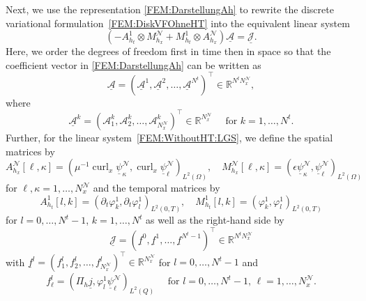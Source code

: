\documentclass[a4paper,11pt]{article}
\newcommand{\R}{\mathbb R}
\newcommand{\cu}{\operatorname{curl}}
\newcommand{\vecA}{\vec{\mathcal A}}
\renewcommand{\vec}[1]{\underline{#1}}
\begin{document}
Next, we use the representation \eqref{FEM:DarstellungAh} to rewrite the discrete variational formulation~\eqref{FEM:DiskVFOhneHT} into the equivalent linear system 
\begin{equation} \label{FEM:WithoutHT:LGS}
	(-A_{h_t}^1 \otimes M_{h_x}^{\mathcal{N}} +  M_{h_t}^1 \otimes A_{h_x}^{\mathcal{N}}) \vec{ \mathcal A }= \vec{\mathcal J}.
\end{equation}
Here, we order the degrees of freedom first in time then in space so that the coefficient vector in  \eqref{FEM:DarstellungAh} can be written as
\begin{equation} \label{FEM:WithoutHT:VectorAh}
	\vecA = ( \vecA^1, \vecA^2, \dots, \vecA^{N^t} )^\top \in \R^{N^t N_x^{\mathcal{N}}},
\end{equation}
where
\begin{equation*}
	\vecA^k = (\mathcal A_1^k, \mathcal A_2^k, \dots, \mathcal A_{N_x^{\mathcal{N}}}^k)^\top \in \R^{N_x^{\mathcal{N}}} \quad \text{ for } k =1,\dots, N^t.
\end{equation*}
Further, for the linear system~\eqref{FEM:WithoutHT:LGS}, we define the spatial matrices by 
\begin{equation} \label{FEM:WithoutHT:Ortsmatrizen}
	A_{h_x}^{\mathcal{N}}[\ell,\kappa] = (\mu^{-1}\cu_x \vec \psi^\mathcal{N}_\kappa, \cu_x \vec \psi^\mathcal{N}_{\ell})_{L^2(\Omega)}, \quad M_{h_x}^{\mathcal{N}}[\ell,\kappa] = (\epsilon \vec \psi^\mathcal{N}_\kappa, \vec \psi^\mathcal{N}_{\ell})_{L^2(\Omega)}
\end{equation}
for $\ell,\kappa=1,\dots,N_x^{\mathcal{N}}$ and the temporal matrices by
\begin{equation}  \label{FEM:WithoutHT:TimeMatrices}
	A_{h_t}^1[l,k] = (\partial_t \varphi^1_k, \partial_t \varphi^1_l)_{L^2(0,T)}, \quad M_{h_t}^1[l,k] = (\varphi^1_k, \varphi^1_l)_{L^2(0,T)}
\end{equation}
for  $l=0,\dots,N^t-1$, $k=1,\dots,N^t$ as well as the right-hand side by
\begin{equation*}
	\vec{\mathcal J} = ( \vec f^0, \vec f^1, \dots, \vec f^{N^t-1} )^\top \in \R^{N^t N_x^{\mathcal{N}}}
\end{equation*}
with $\vec f^l = (f_1^l, f_2^l, \dots, f_{N_x^{\mathcal{N}}}^l)^\top \in \R^{N_x^{\mathcal{N}}}$ for $l = 0,\dots, N^t-1$ and
\begin{equation} \label{FEM:WithoutHT:RSf}
	f_\ell^l = (\Pi_h \vec j,\varphi^1_l \vec \psi^\mathcal{N}_{\ell} )_{L^2(Q)} \quad \text{ for } l=0,\dots, N^t-1, \, \ell=1,\dots,N_x^{\mathcal{N}}.
\end{equation}
\end{document}
